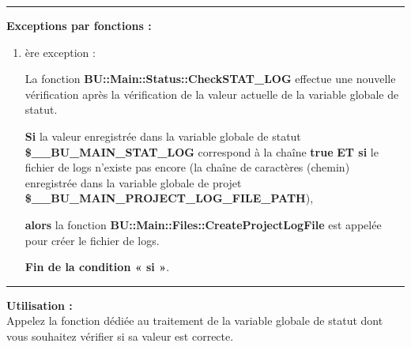 \documentclass[a4paper,10pt]{article}
\begin{document}

\par\noindent\rule{\textwidth}{0.4pt}

\begin{justify}
    \textbf{Exceptions par fonctions :}
\end{justify}

\begin{justify}
    \begin{enumerate}
        \item
        {
            ère exception :

            \begin{justify}
                La fonction \textbf{\color{func}BU::Main::Status::CheckSTAT\_LOG} effectue une nouvelle vérification après la vérification de la valeur actuelle de la variable globale de statut.
            \end{justify}

            \begin{justify}
                \textbf{\color{cond}Si} la valeur enregistrée dans la variable globale de statut \textbf{\color{vars}\$\_\_BU\_MAIN\_STAT\_LOG} correspond à la chaîne \textbf{true} \textbf{\color{cond}ET si} le fichier de logs n'existe pas encore (la chaîne de caractères (chemin) enregistrée dans la variable globale de projet \textbf{\color{vars}\$\_\_BU\_MAIN\_PROJECT\_LOG\_FILE\_PATH}),
            \end{justify}

            \begin{justify}
                \textbf{\color{cond} alors} la fonction \textbf{\color{func}BU::Main::Files::CreateProjectLogFile} est appelée pour créer le fichier de logs.
            \end{justify}

            \begin{justify}
                \textbf{\color{cond}Fin de la condition « si »}.
            \end{justify}
        }
    \end{enumerate}
\end{justify}


\par\noindent\rule{\textwidth}{0.4pt}

\begin{justify}
    \textbf{Utilisation :}\\[1\baselineskip]
    Appelez la fonction dédiée au traitement de la variable globale de statut dont vous souhaitez vérifier si sa valeur est correcte.
\end{justify}
\end{document}
